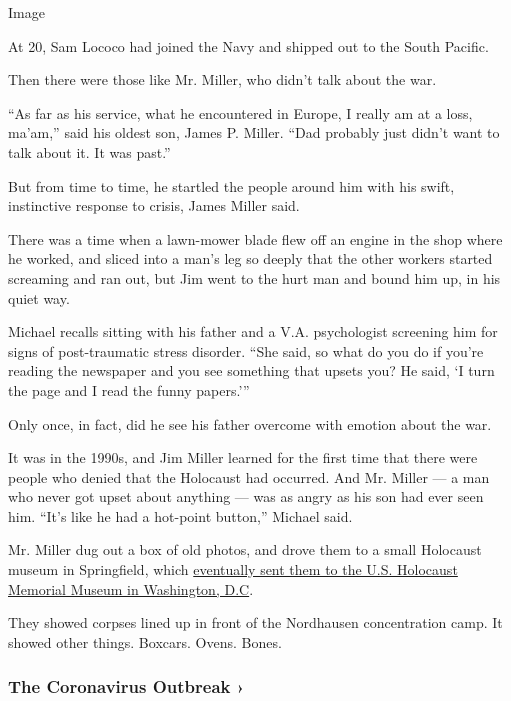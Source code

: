 Image

At 20, Sam Lococo had joined the Navy and shipped out to the South
Pacific.

Then there were those like Mr. Miller, who didn't talk about the war.

``As far as his service, what he encountered in Europe, I really am at a
loss, ma'am,'' said his oldest son, James P. Miller. ``Dad probably just
didn't want to talk about it. It was past.''

But from time to time, he startled the people around him with his swift,
instinctive response to crisis, James Miller said.

There was a time when a lawn-mower blade flew off an engine in the shop
where he worked, and sliced into a man's leg so deeply that the other
workers started screaming and ran out, but Jim went to the hurt man and
bound him up, in his quiet way.

Michael recalls sitting with his father and a V.A. psychologist
screening him for signs of post-traumatic stress disorder. ``She said,
so what do you do if you're reading the newspaper and you see something
that upsets you? He said, `I turn the page and I read the funny
papers.'''

Only once, in fact, did he see his father overcome with emotion about
the war.

It was in the 1990s, and Jim Miller learned for the first time that
there were people who denied that the Holocaust had occurred. And Mr.
Miller --- a man who never got upset about anything --- was as angry as
his son had ever seen him. ``It's like he had a hot-point button,''
Michael said.

Mr. Miller dug out a box of old photos, and drove them to a small
Holocaust museum in Springfield, which
\href{https://collections.ushmm.org/search/catalog/irn43802}{eventually
sent them to the U.S. Holocaust Memorial Museum in Washington, D.C}.

They showed corpses lined up in front of the Nordhausen concentration
camp. It showed other things. Boxcars. Ovens. Bones.

\href{https://www.nytimes.com/news-event/coronavirus?action=click\&pgtype=Article\&state=default\&region=MAIN_CONTENT_3\&context=storylines_faq}{}

\hypertarget{the-coronavirus-outbreak-}{%
\subsubsection{The Coronavirus Outbreak
›}\label{the-coronavirus-outbreak-}}

